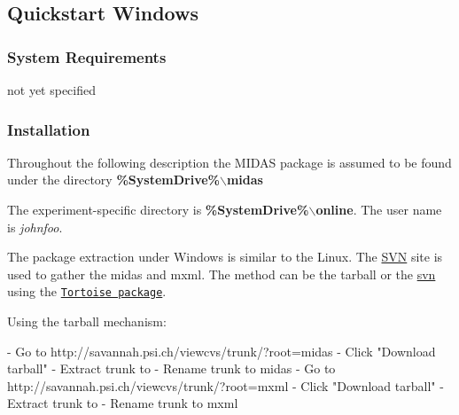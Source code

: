 \par
 

\par


\label{index_end}
\hypertarget{index_end}{}
 \subsection{Quickstart Windows}\label{Q_Windows}
\par
 

\par
\hypertarget{Q_Windows_Q_Windows_system_requirements}{}\subsubsection{System Requirements}\label{Q_Windows_Q_Windows_system_requirements}
not yet specified\hypertarget{Q_Windows_Q_Windows_installation}{}\subsubsection{Installation}\label{Q_Windows_Q_Windows_installation}
Throughout the following description the MIDAS package is assumed to be found under the directory {\bfseries  \%SystemDrive\%$\backslash$midas } \par
The experiment-\/specific directory is {\bfseries \%SystemDrive\%$\backslash$online}. The user name is {\itshape johnfoo\/}.


\begin{DoxyItemize}
\item The package extraction under Windows is similar to the Linux. The \hyperlink{Quickstart_Q_SVN}{SVN} site is used to gather the midas and mxml. The method can be the tarball or the \hyperlink{Quickstart_Q_SVN}{svn} using the \href{http://tortoisesvn.net}{\tt Tortoise package}.
\end{DoxyItemize}


\begin{DoxyItemize}
\item Using the tarball mechanism: 
\begin{DoxyCode}
 - Go to http://savannah.psi.ch/viewcvs/trunk/?root=midas
 - Click "Download tarball"
 - Extract trunk to %
 - Rename trunk to midas
 - Go to http://savannah.psi.ch/viewcvs/trunk/?root=mxml
 - Click "Download tarball"
 - Extract trunk to %
 - Rename trunk to mxml
\end{DoxyCode}

\end{DoxyItemize}


